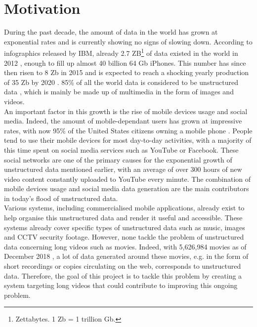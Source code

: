 \section{Motivation}

During the past decade, the amount of data in the world has grown at exponential rates and is currently showing no signs of slowing down. According to infographics released by IBM, already 2.7 ZB\footnote{Zettabytes. 1 Zb = 1 trillion Gb.} of data existed in the world in 2012 \cite{karr_2012}, enough to fill up almost 40 billion 64 Gb iPhones. This number has since then risen to 8 Zb in 2015 and is expected to reach a shocking yearly production of 35 Zb by 2020 \cite{deutscher_2012} \cite{karr_2012}. 85\% of all the world data is considered to be unstructured data \cite{blumberg2003problem}, which is mainly be made up of multimedia in the form of images and videos.\\

An important factor in this growth is the rise of mobile devices usage and social media. Indeed, the amount of mobile-dependant users has grown at impressive rates, with now 95\% of the United States citizens owning a mobile phone \cite{fanning2012increasing}. People tend to use their mobile devices for most day-to-day activities, with a majority of this time spent on social media services such as YouTube or Facebook. These social networks are one of the primary causes for the exponential growth of unstructured data mentioned earlier, with an average of over 300 hours of new video content constantly uploaded to YouTube every minute. The combination of mobile devices usage and social media data generation are the main contributors in today's flood of unstructured data.\\

Various systems, including commercialised mobile applications, already exist to help organise this unstructured data and render it useful and accessible. These systems already cover specific types of unstructured data such as music, images and CCTV security footage. However, none tackle the problem of unstructured data concerning long videos such as movies. Indeed, with 5,626,984 movies as of December 2018 \cite{imdb2018stats}, a lot of data generated around these movies, e.g. in the form of short recordings or copies circulating on the web, corresponds to unstructured data. Therefore, the goal of this project is to tackle this problem by creating a system targeting long videos that could contribute to improving this ongoing problem.


